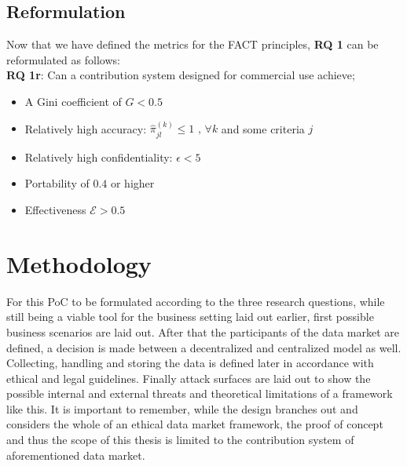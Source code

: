 \documentclass[a4paper,11pt]{report} %
\theoremstyle{change}
\theoremstyle{theoremstyle}
\begin{document}
\subsection{Reformulation}
Now that we have defined the metrics for the FACT principles, \textbf{RQ 1} can be reformulated as follows:\\
\textbf{RQ 1r}\label{RQ1r}: Can a contribution system designed for commercial use achieve;
\begin{itemize}
    \item A Gini coefficient of $G < 0.5$
    \item Relatively high accuracy: $\hat{\pi}^{(k)}_{jl} \leq 1 \text{ , } \forall k$ and some criteria $j$
    \item Relatively high confidentiality: $\epsilon < 5$
    \item Portability of $0.4$ or higher
    \item Effectiveness $\mathcal{E} > 0.5$
\end{itemize}

\section{Methodology}
For this PoC to be formulated according to the three research questions, while still being a viable tool for the business setting laid out earlier, first possible business scenarios are laid out. After that the participants of the data market are defined, a decision is made between a decentralized and centralized model as well. Collecting, handling and storing the data is defined later in accordance with ethical and legal guidelines. Finally attack surfaces are laid out to show the possible internal and external threats and theoretical limitations of a framework like this. It is important to remember, while the design branches out and considers the whole of an ethical data market framework, the proof of concept and thus the scope of this thesis is limited to the contribution system of aforementioned data market.
\end{document}
